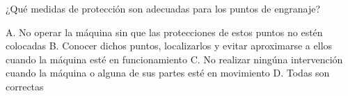 \documentclass[answers,11pt]{exam}
\begin{document}
{\begin{questions}
\question ¿Qué medidas de protección son adecuadas para los puntos de engranaje?
\begin{checkboxes}
\choice A. No operar la máquina sin que las protecciones de estos puntos no estén colocadas
\choice B. Conocer dichos puntos, localizarlos y evitar aproximarse a ellos
cuando la máquina esté en funcionamiento 
\choice C. No realizar ningúna intervención cuando la máquina o alguna de sus
partes esté en movimiento 
\CorrectChoice D. Todas son correctas
\end{checkboxes}

\end{questions}}
\end{document}
